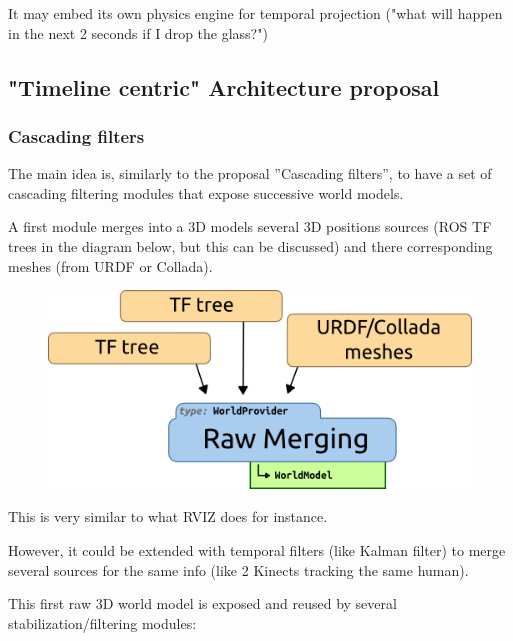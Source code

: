 \documentclass[a4paper]{article}
\begin{document}
It may embed its own physics engine for temporal projection ("what will happen
in the next 2 seconds if I drop the glass?") 

\subsection{"Timeline centric" Architecture proposal}

\subsubsection{Cascading filters}

The main idea is, similarly to the proposal ''Cascading filters'', to have a
set of cascading filtering modules that expose successive world models.

A first module merges into a 3D models several 3D positions sources (ROS TF
trees in the diagram below, but this can be discussed) and there corresponding
meshes (from URDF or Collada).

\begin{figure}[!h]
    \centering
    \includegraphics[scale=0.5]{images/spark2_archi2_1.png}
\end{figure}

This is very similar to what RVIZ does for instance.

However, it could be extended with temporal filters (like Kalman filter) to
merge several sources for the same info (like 2 Kinects tracking the same
human).

This first raw 3D world model is exposed and reused by several
stabilization/filtering modules:
\end{document}
